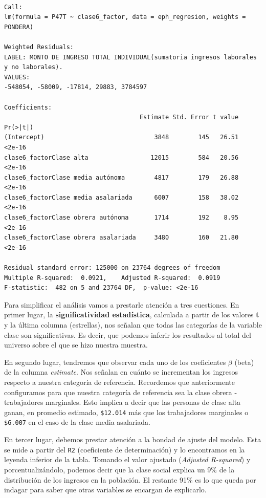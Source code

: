 \documentclass[
]{article}
\begin{document}
\begin{verbatim}

Call:
lm(formula = P47T ~ clase6_factor, data = eph_regresion, weights = PONDERA)

Weighted Residuals:
LABEL: MONTO DE INGRESO TOTAL INDIVIDUAL(sumatoria ingresos laborales y no laborales). 
VALUES:
-548054, -58009, -17814, 29883, 3784597

Coefficients:
                                     Estimate Std. Error t value Pr(>|t|)
(Intercept)                              3848        145   26.51   <2e-16
clase6_factorClase alta                 12015        584   20.56   <2e-16
clase6_factorClase media autónoma        4817        179   26.88   <2e-16
clase6_factorClase media asalariada      6007        158   38.02   <2e-16
clase6_factorClase obrera autónoma       1714        192    8.95   <2e-16
clase6_factorClase obrera asalariada     3480        160   21.80   <2e-16

Residual standard error: 125000 on 23764 degrees of freedom
Multiple R-squared:  0.0921,    Adjusted R-squared:  0.0919 
F-statistic:  482 on 5 and 23764 DF,  p-value: <2e-16
\end{verbatim}

Para simplificar el análisis vamos a prestarle atención a tres cuestiones. En primer lugar, la \textbf{significatividad estadística}, calculada a partir de los valores \textbf{t} y la última columna (estrellas), nos señalan que todas las categorías de la variable clase son significativas. Es decir, que podemos inferir los resultados al total del universo sobre el que se hizo nuestra muestra.

En segundo lugar, tendremos que observar cada uno de los coeficientes \(\beta\) (beta) de la columna \emph{estimate}. Nos señalan en cuánto se incrementan los ingresos respecto a nuestra categoría de referencia. Recordemos que anteriormente configuramos para que nuestra categoría de referencia sea la clase obrera - trabajadores marginales. Esto implica a decir que las personas de clase alta ganan, en promedio estimado, \texttt{\$12.014} más que los trabajadores marginales o \texttt{\$6.007} en el caso de la clase media asalariada.

En tercer lugar, debemos prestar atención a la bondad de ajuste del modelo. Esta se mide a partir del \texttt{R2} (coeficiente de determinación) y lo encontramos en la leyenda inferior de la tabla. Tomando el valor ajustado (\emph{Adjusted R-squared}) y porcentualizándolo, podemos decir que la clase social explica un 9\% de la distribución de los ingresos en la población. El restante 91\% es lo que queda por indagar para saber que otras variables se encargan de explicarlo.
\end{document}
